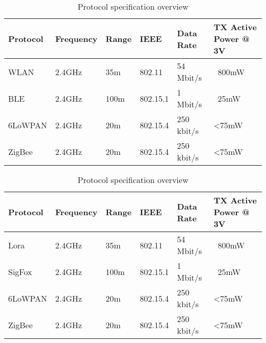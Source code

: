 \begin{table}[h!]
\begin{center}
	\begin{tabulary}{\textwidth}{L|L|L|L|L|L}
	Protocol & Frequency & Range & IEEE     & Data Rate  & TX Active Power @ 3V \\\hline
	WLAN     & 2.4GHz    & 35m   & 802.11   & 54 Mbit/s  & ~800mW \\
	BLE      & 2.4GHz    & 100m  & 802.15.1 & 1 Mbit/s   & ~25mW  \\
	6LoWPAN  & 2.4GHz    & 20m   & 802.15.4 & 250 kbit/s & <75mW \\
	ZigBee   & 2.4GHz    & 20m   & 802.15.4 & 250 kbit/s & <75mW \\\hline
	\end{tabulary}
	\caption{\label{tab:protocol_overview} Protocol specification overview \cite{bregell_hardware_2015}}
\end{center}
\end{table}


\begin{table}[h!]
\begin{center}
	\begin{tabulary}{\textwidth}{L|L|L|L|L|L}
	Protocol & Frequency & Range & IEEE     & Data Rate  & TX Active Power @ 3V \\\hline
	Lora     & 2.4GHz    & 35m   & 802.11   & 54 Mbit/s  & ~800mW \\
	SigFox   & 2.4GHz    & 100m  & 802.15.1 & 1 Mbit/s   & ~25mW  \\
	6LoWPAN  & 2.4GHz    & 20m   & 802.15.4 & 250 kbit/s & <75mW \\
	ZigBee   & 2.4GHz    & 20m   & 802.15.4 & 250 kbit/s & <75mW \\\hline
	\end{tabulary}
	\caption{\label{tab:protocol_overview1} Protocol specification overview \cite{bregell_hardware_2015}}
\end{center}
\end{table}



